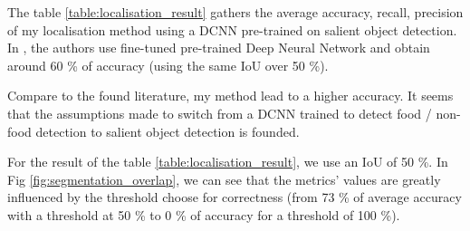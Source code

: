 The table \ref{table:localisation_result} gathers the average accuracy, recall, precision of my localisation method using a DCNN pre-trained on salient object detection. In \cite{Bolanos2016}, the authors use fine-tuned pre-trained Deep Neural Network and obtain around 60 \% of accuracy (using the same IoU over 50 \%).

Compare to the found literature, my method lead to a higher accuracy. It seems that the assumptions made to switch from a DCNN trained to detect food / non-food detection to salient object detection is founded.

For the result of the table \ref{table:localisation_result}, we use an IoU of 50 \%. In Fig \ref{fig:segmentation_overlap}, we can see that the metrics' values are greatly influenced by the threshold choose for correctness (from 73 \% of average accuracy with a threshold at 50 \% to 0 \% of accuracy for a threshold of 100 \%).


